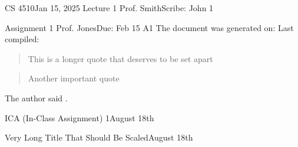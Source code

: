 \documentclass[11pt]{article}
\begin{document}
  \newpage\handout
  {CS 4510}{Jan 15, 2025}
  {Lecture 1}
  {Prof. Smith}{Scribe: John}
  {1}
  
  {Assignment 1}
  {Prof. Jones}{Due: Feb 15}
  {A1}
  The document was generated on: \generatedOn
  Last compiled: \generatedOn


  \blockquote{This is a longer quote that deserves to be set apart}
  \blockquote{Another important quote}
  The author said .
  

               {ICA (In-Class Assignment) 1}{August 18th}

                {Very Long Title That Should Be Scaled}{August 18th}


  
\end{document}

